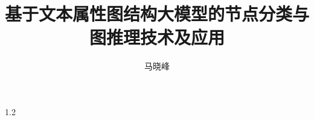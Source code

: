 \documentclass[master,oneside,AutoFakeBold]{zjuthesis} %
\title{基于文本属性图结构大模型的节点分类与图推理技术及应用} %
\author{马晓峰}
\institute{软件学院}         %
\begin{document}
\maketitle

\abstractmatter



\frontmatter
\begin{spacing}{1.2}
       \tableofcontents %
       \listoffigures   %
       \listoftables    %
\end{spacing}

%

\mainmatter

\backmatter




%




\end{document}
